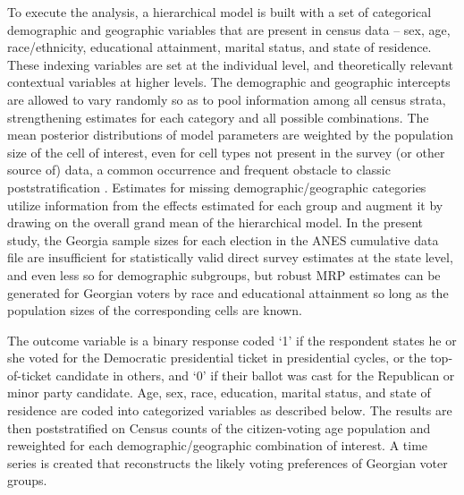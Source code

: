  To execute the analysis, a hierarchical model is built with a set of categorical demographic and geographic variables that are present in census data -- sex, age, race/ethnicity, educational attainment, marital status, and state of residence. These indexing variables are set at the individual level, and theoretically relevant contextual variables at higher levels. The demographic and geographic intercepts are allowed to vary randomly so as to pool information among all census strata, strengthening estimates for each category and all possible combinations. The mean posterior distributions of model parameters are weighted by the population size of the cell of interest, even for cell types not present in the survey (or other source of) data, a common occurrence and frequent obstacle to classic poststratification \citep{gelman_data_2006}. Estimates for missing demographic/geographic categories utilize information from the effects estimated for each group and augment it by drawing on the overall grand mean of the hierarchical model. In the present study, the Georgia sample sizes for each election in the ANES cumulative data file are insufficient for statistically valid direct survey estimates at the state level, and even less so for demographic subgroups, but robust MRP estimates can be generated for Georgian voters by race and educational attainment so long as the population sizes of the corresponding cells are known.   

The outcome variable is a binary response coded `1' if the respondent states he or she voted for the Democratic presidential ticket in presidential cycles, or the top-of-ticket candidate in others, and `0' if their ballot was cast for the Republican or minor party candidate.  Age, sex, race, education, marital status, and state of residence are coded into categorized variables as described below. The results are then poststratified on Census counts of the citizen-voting age population and reweighted for each demographic/geographic combination of interest. A time series is created that reconstructs the likely voting preferences of Georgian voter groups.  

